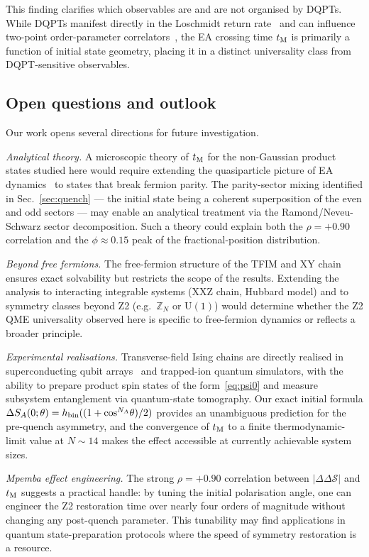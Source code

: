 This finding clarifies which observables are and are not organised by DQPTs.
While DQPTs manifest directly in the Loschmidt return rate~\cite{Heyl2013} and
can influence two-point order-parameter correlators~\cite{Zunkovic2018},
the EA crossing time $t_{\rm M}$ is primarily a function of initial state geometry,
placing it in a distinct universality class from DQPT-sensitive observables.

\subsection{Open questions and outlook}
\label{sec:outlook}

Our work opens several directions for future investigation.

\emph{Analytical theory.}
A microscopic theory of $t_{\rm M}$ for the non-Gaussian product states studied here
would require extending the quasiparticle picture of EA dynamics~\cite{Rylands2024}
to states that break fermion parity.
The parity-sector mixing identified in Sec.~\ref{sec:quench} — the initial state
being a coherent superposition of the even and odd sectors — may enable an
analytical treatment via the Ramond/Neveu-Schwarz sector decomposition.
Such a theory could explain both the $\rho = +0.90$ correlation and the
$\phi \approx 0.15$ peak of the fractional-position distribution.

\emph{Beyond free fermions.}
The free-fermion structure of the TFIM and XY chain ensures exact solvability
but restricts the scope of the results.
Extending the analysis to interacting integrable systems (XXZ chain, Hubbard model)
and to symmetry classes beyond Z2 (e.g.\ $\mathbb{Z}_N$ or $\mathrm{U}(1)$) would
determine whether the Z2 QME universality observed here is specific to free-fermion
dynamics or reflects a broader principle.

\emph{Experimental realisations.}
Transverse-field Ising chains are directly realised in superconducting qubit
arrays~\cite{Bloch2008} and trapped-ion quantum simulators, with the ability to
prepare product spin states of the form~\eqref{eq:psi0} and measure subsystem
entanglement via quantum-state tomography.
Our exact initial formula $\Delta S_A(0;\theta) = h_{\rm bin}((1+\cos^{N_A}\!\theta)/2)$
provides an unambiguous prediction for the pre-quench asymmetry, and the
convergence of $t_{\rm M}$ to a finite thermodynamic-limit value at $N \sim 14$
makes the effect accessible at currently achievable system sizes.

\emph{Mpemba effect engineering.}
The strong $\rho = +0.90$ correlation between $|\Delta\Delta\mathcal{S}|$ and $t_{\rm M}$
suggests a practical handle: by tuning the initial polarisation angle, one can
engineer the Z2 restoration time over nearly four orders of magnitude without changing
any post-quench parameter.
This tunability may find applications in quantum state-preparation protocols where
the speed of symmetry restoration is a resource.
